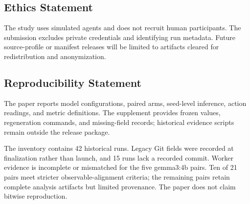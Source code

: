 \documentclass{article}
\begin{document}
\subsection*{Ethics Statement}
The study uses simulated agents and does not recruit human participants. The submission excludes private credentials and identifying run metadata. Future source-profile or manifest releases will be limited to artifacts cleared for redistribution and anonymization.

\subsection*{Reproducibility Statement}
The paper reports model configurations, paired arms, seed-level inference, action readings, and metric definitions. The supplement provides frozen values, regeneration commands, and missing-field records; historical evidence scripts remain outside the release package.

The inventory contains 42 historical runs. Legacy Git fields were recorded at finalization rather than launch, and 15 runs lack a recorded commit. Worker evidence is incomplete or mismatched for the five gemma3:4b pairs. Ten of 21 pairs meet stricter observable-alignment criteria; the remaining pairs retain complete analysis artifacts but limited provenance. The paper does not claim bitwise reproduction.

\clearpage


\end{document}
